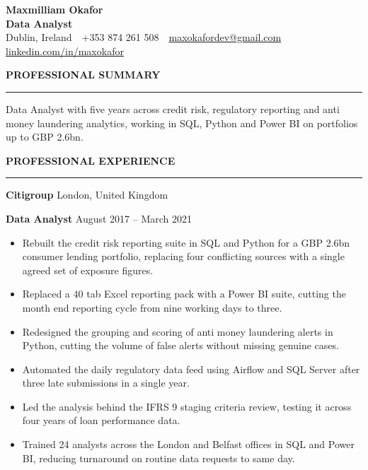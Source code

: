 \documentclass[11pt,a4paper]{article}
\newcommand{\cvsection}[1]{%
  \vspace{7pt}\par
  {\color{navy}\bfseries\large #1}\par
  \vspace{1.5pt}%
  \textcolor{rulecol}{\rule{\textwidth}{0.5pt}}\par
  \vspace{3pt}}
\newcommand{\role}[4]{%
  \vspace{5pt}\par
  {\bfseries #1} \hfill {\color{muted}#2}\par
  {\bfseries #3} \hfill {\color{muted}#4}\par
  \vspace{1pt}}
\begin{document}
\begin{center}
  {\color{navy}\bfseries\fontsize{20}{23}\selectfont Maxmilliam Okafor}\\[4pt]
  {\bfseries Data Analyst}\\[3pt]
  {\color{muted}Dublin, Ireland \,\textbar\, +353 874 261 508 \,\textbar\, \href{mailto:maxokafordev@gmail.com}{maxokafordev@gmail.com} \,\textbar\, \href{https://www.linkedin.com/in/maxokafor/}{linkedin.com/in/maxokafor}}
\end{center}
\vspace{-6pt}

\cvsection{PROFESSIONAL SUMMARY}
Data Analyst with five years across credit risk, regulatory reporting
and anti money laundering analytics, working in SQL, Python and Power
BI on portfolios up to GBP 2.6bn.

\cvsection{PROFESSIONAL EXPERIENCE}

\role{Citigroup}{London, United Kingdom}{Data Analyst}{August 2017 -- March 2021}
\begin{itemize}
  \item Rebuilt the credit risk reporting suite in SQL and Python for a GBP 2.6bn consumer lending portfolio, replacing four conflicting sources with a single agreed set of exposure figures.
  \item Replaced a 40 tab Excel reporting pack with a Power BI suite, cutting the month end reporting cycle from nine working days to three.
  \item Redesigned the grouping and scoring of anti money laundering alerts in Python, cutting the volume of false alerts without missing genuine cases.
  \item Automated the daily regulatory data feed using Airflow and SQL Server after three late submissions in a single year.
  \item Led the analysis behind the IFRS 9 staging criteria review, testing it across four years of loan performance data.
  \item Trained 24 analysts across the London and Belfast offices in SQL and Power BI, reducing turnaround on routine data requests to same day.
\end{itemize}
\end{document}
